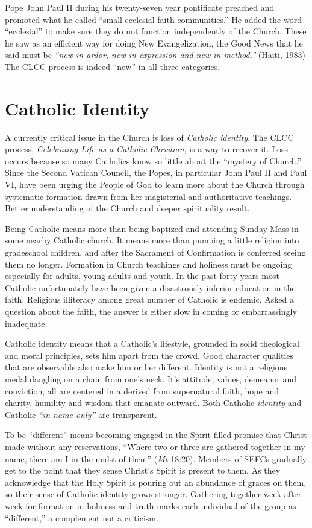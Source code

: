 \documentclass{article}
\begin{document}
Pope John Paul II during his twenty-seven year pontificate preached and promoted
what he called ``small ecclesial faith communities.'' He added the word
``ecclesial'' to make sure they do not function independently of the
Church. These he saw as an efficient way for doing New Evangelization, the Good
News that he said must be \emph{``new in ardor, new in expression and new in
method.''}  (Haiti, 1983) The CLCC process is indeed ``new'' in all three
categories.

\section{Catholic Identity}

A currently critical issue in the Church is loss of \emph{Catholic
identity}. The CLCC process, \emph{Celebrating Life as a Catholic Christian}, is
a way to recover it. Loss occurs because so many Catholics know so little about
the ``mystery of Church.'' Since the Second Vatican Council, the Popes, in
particular John Paul II and Paul VI, have been urging the People of God to learn
more about the Church through systematic formation drawn from her magisterial
and authoritative teachings. Better understanding of the Church and deeper
spirituality result.

Being Catholic means more than being baptized and attending Sunday Mass in some
nearby Catholic church. It means more than pumping a little religion into
gradeschool children, and after the Sacrament of Confirmation is conferred
seeing them no longer. Formation in Church teachings and holiness must be
ongoing especially for adults, young adults and youth. In the past forty years
most Catholic unfortunately have been given a disastrously inferior education in
the faith. Religious illiteracy among great number of Catholic is endemic, Asked
a question about the faith, the answer is either slow in coming or
embarrassingly inadequate.

Catholic identity means that a Catholic's lifestyle, grounded in solid
theological and moral principles, sets him apart from the crowd. Good character
qualities that are observable also make him or her different. Identity is not a
religious medal dangling on a chain from one's neck. It's attitude, values,
demeanor and conviction, all are centered in a derived from supernatural faith,
hope and charity, humility and wisdom that emanate outward. Both Catholic
\emph{identity} and Catholic \emph{``in name only''} are transparent.

To be ``different'' means becoming engaged in the Spirit-filled promise that
Christ made without any reservations, ``Where two or three are gathered together
in my name, there am I in the midst of them'' (\emph{Mt} 18:20). Members of
SEFCs gradually get to the point that they sense Christ's Spirit is present to
them. As they acknowledge that the Holy Spirit is pouring out an abundance of
graces on them, so their sense of Catholic identity grows stronger. Gathering
together week after week for formation in holiness and truth marks each
individual of the group as ``different,'' a complement not a criticism.
\end{document}
